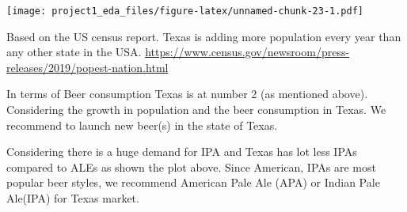 \documentclass[]{article}
\begin{document}
\texttt{[image: project1\_eda\_files/figure-latex/unnamed-chunk-23-1.pdf]}

Based on the US census report. Texas is adding more population every
year than any other state in the USA.
\url{https://www.census.gov/newsroom/press-releases/2019/popest-nation.html}

In terms of Beer consumption Texas is at number 2 (as mentioned above).
Considering the growth in population and the beer consumption in Texas.
We recommend to launch new beer(s) in the state of Texas.

Considering there is a huge demand for IPA and Texas has lot less IPAs
compared to ALEs as shown the plot above. Since American, IPAs are most
popular beer styles, we recommend American Pale Ale (APA) or Indian Pale
Ale(IPA) for Texas market.
\end{document}
